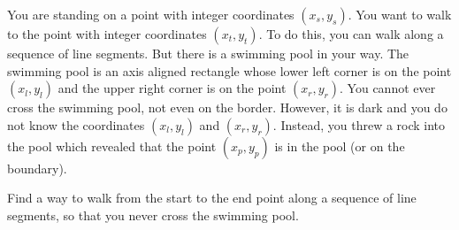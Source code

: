 


You are standing on a point with integer coordinates $(x_s, y_s)$. 
You want to walk to the point with integer coordinates $(x_t, y_t)$. 
To do this, you can walk along a sequence of line segments. 
But there is a swimming pool in your way. The swimming pool is an axis aligned 
rectangle whose lower left corner is on the point $(x_l, y_l)$ and the upper right 
corner is on the point $(x_r, y_r)$. You cannot ever cross the swimming pool, 
not even on the border. However, it is dark and you do not know the 
coordinates $(x_l, y_l)$ and $(x_r, y_r)$. Instead, you threw a rock into the pool which 
revealed that the point $(x_p, y_p)$ is in the pool (or on the boundary).

Find a way to walk from the start to the end point along a sequence of line segments, 
so that you never cross the swimming pool.

